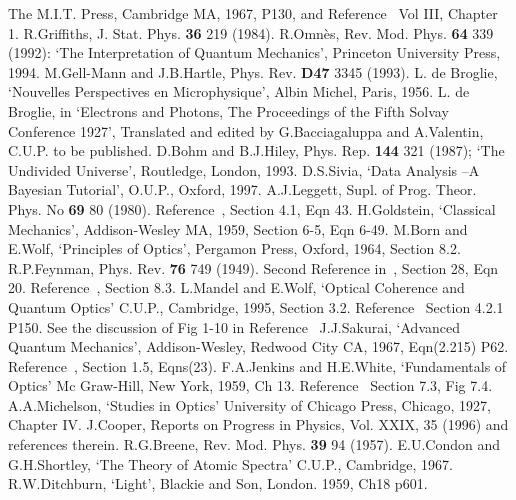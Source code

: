 \documentclass [12pt]{article}
\begin{document}
{\begin{thebibliography}{99}
  The M.I.T. Press, Cambridge MA, 1967, P130, and Reference~\cite{Feyn2}
   Vol III, Chapter 1. 
  R.Griffiths, J. Stat. Phys. {\bf 36} 219 (1984).
  R.Omn\`{e}s,  Rev. Mod. Phys. {\bf 64} 339 (1992):
  `The Interpretation of Quantum Mechanics',
   Princeton University Press, 1994.
  M.Gell-Mann and J.B.Hartle, Phys. Rev. {\bf D47} 3345 (1993).
  L. de Broglie, `Nouvelles Perspectives en Microphysique',
   Albin Michel, Paris, 1956.
  L. de Broglie, in `Electrons and Photons, The Proceedings
  of the Fifth Solvay Conference 1927', Translated and edited
 by G.Bacciagaluppa and A.Valentin, C.U.P. to be
 published.
   D.Bohm and B.J.Hiley, Phys. Rep. {\bf 144} 321 (1987);
  `The Undivided Universe', Routledge, London, 1993.
 D.S.Sivia, `Data Analysis --A Bayesian Tutorial',
   O.U.P., Oxford, 1997.
  A.J.Leggett, Supl. of Prog. Theor. Phys. No {\bf 69}
  80 (1980).
 Reference~\cite{Feyn6}, Section 4.1, Eqn 43.
  H.Goldstein, `Classical Mechanics',
  Addison-Wesley MA, 1959, Section 6-5, Eqn 6-49.
    M.Born and E.Wolf, `Principles of Optics',
 Pergamon Press, Oxford, 1964, Section 8.2.
   R.P.Feynman, Phys. Rev. {\bf 76} 749 (1949).
   Second Reference in~\cite{Dirac1}, Section 28, Eqn 20.
   Reference~\cite{BW1}, Section 8.3.
 L.Mandel and E.Wolf, `Optical Coherence and
   Quantum Optics' C.U.P., Cambridge, 1995, Section 3.2.
 Reference~\cite{MW1} Section 4.2.1 P150.
  See the discussion of Fig 1-10 in 
 Reference~\cite{Feyn6}
 J.J.Sakurai, `Advanced Quantum Mechanics', Addison-Wesley,
  Redwood City CA, 1967, Eqn(2.215) P62.
 Reference~\cite{BW1}, Section 1.5, Eqns(23).
 F.A.Jenkins and H.E.White, `Fundamentals of Optics'
  Mc Graw-Hill, New York, 1959, Ch 13.
 Reference~\cite{MW1} Section 7.3, Fig 7.4.
  A.A.Michelson, `Studies in Optics' University of
   Chicago Press, Chicago, 1927, Chapter IV.
  J.Cooper, Reports on Progress in Physics,
    Vol. XXIX, 35 (1996) and references
   therein.
   R.G.Breene, Rev. Mod. Phys. {\bf 39} 94 (1957).
 E.U.Condon and G.H.Shortley, `The Theory of Atomic Spectra'
 C.U.P., Cambridge, 1967.
 R.W.Ditchburn,   `Light', Blackie  and Son, London. 1959, Ch18 p601.

\end{thebibliography}}
\end{document}
